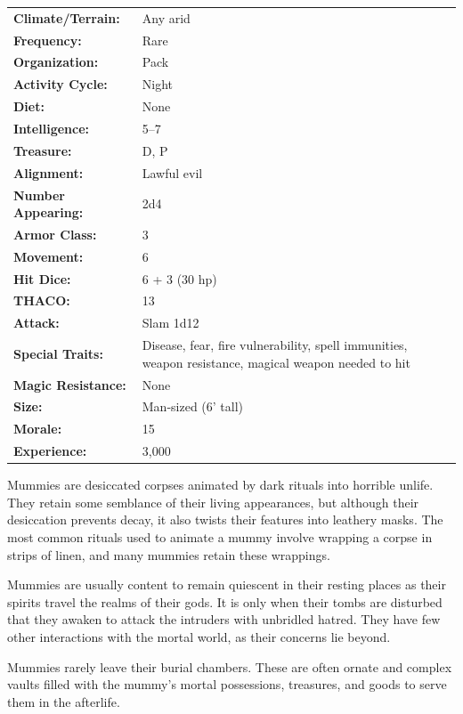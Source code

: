 \begin{multicols}{2}
\begin{minipage}{\columnwidth}
\noindent \begin{tabular}{p{}p{}}
\textbf{Climate/Terrain:}	& Any arid	\\
\textbf{Frequency:} 		& Rare	\\
\textbf{Organization:} 		& Pack	\\
\textbf{Activity Cycle:} 	& Night	\\
\textbf{Diet:} 				& None	\\
\textbf{Intelligence:} 		& 5--7	\\
\textbf{Treasure:} 			& D, P	\\
\textbf{Alignment:} 		& Lawful evil	\\
\hline
\textbf{Number Appearing:} 	& 2d4	\\
\textbf{Armor Class:} 		& 3	\\
\textbf{Movement:} 			& 6	\\
\textbf{Hit Dice:} 			& 6 + 3 (30 hp)	\\
\textbf{THACO:} 			& 13	\\
\textbf{Attack:} 			& Slam 1d12	\\
\textbf{Special Traits:} & Disease, fear, fire vulnerability, spell immunities, weapon resistance, magical weapon needed to hit	\\
\textbf{Magic Resistance:} 	& None	\\
\textbf{Size:} 				& Man-sized (6' tall)	\\
\textbf{Morale:} 			& 15	\\
\textbf{Experience:} 		& 3,000	\\
\end{tabular}

\end{minipage}

Mummies are desiccated corpses animated by dark rituals into horrible unlife. They retain some semblance of their living appearances, but although their desiccation prevents decay, it also twists their features into leathery masks. The most common rituals used to animate a mummy involve wrapping a corpse in strips of linen, and many mummies retain these wrappings.

Mummies are usually content to remain quiescent in their resting places as their spirits travel the realms of their gods. It is only when their tombs are disturbed that they awaken to attack the intruders with unbridled hatred. They have few other interactions with the mortal world, as their concerns lie beyond.

Mummies rarely leave their burial chambers. These are often ornate and complex vaults filled with the mummy's mortal possessions, treasures, and goods to serve them in the afterlife.


\end{multicols}
